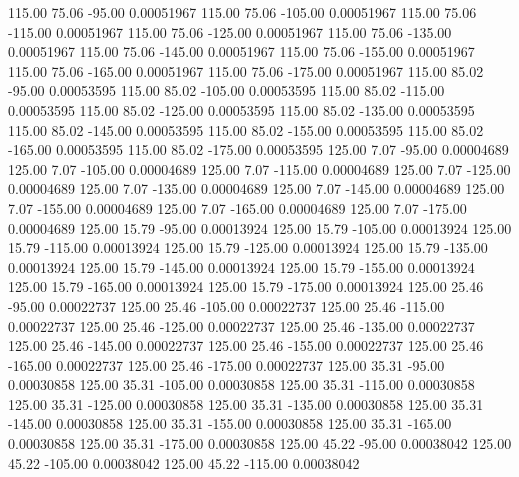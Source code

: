     115.00     75.06    -95.00     0.00051967
    115.00     75.06   -105.00     0.00051967
    115.00     75.06   -115.00     0.00051967
    115.00     75.06   -125.00     0.00051967
    115.00     75.06   -135.00     0.00051967
    115.00     75.06   -145.00     0.00051967
    115.00     75.06   -155.00     0.00051967
    115.00     75.06   -165.00     0.00051967
    115.00     75.06   -175.00     0.00051967
    115.00     85.02    -95.00     0.00053595
    115.00     85.02   -105.00     0.00053595
    115.00     85.02   -115.00     0.00053595
    115.00     85.02   -125.00     0.00053595
    115.00     85.02   -135.00     0.00053595
    115.00     85.02   -145.00     0.00053595
    115.00     85.02   -155.00     0.00053595
    115.00     85.02   -165.00     0.00053595
    115.00     85.02   -175.00     0.00053595
    125.00      7.07    -95.00     0.00004689
    125.00      7.07   -105.00     0.00004689
    125.00      7.07   -115.00     0.00004689
    125.00      7.07   -125.00     0.00004689
    125.00      7.07   -135.00     0.00004689
    125.00      7.07   -145.00     0.00004689
    125.00      7.07   -155.00     0.00004689
    125.00      7.07   -165.00     0.00004689
    125.00      7.07   -175.00     0.00004689
    125.00     15.79    -95.00     0.00013924
    125.00     15.79   -105.00     0.00013924
    125.00     15.79   -115.00     0.00013924
    125.00     15.79   -125.00     0.00013924
    125.00     15.79   -135.00     0.00013924
    125.00     15.79   -145.00     0.00013924
    125.00     15.79   -155.00     0.00013924
    125.00     15.79   -165.00     0.00013924
    125.00     15.79   -175.00     0.00013924
    125.00     25.46    -95.00     0.00022737
    125.00     25.46   -105.00     0.00022737
    125.00     25.46   -115.00     0.00022737
    125.00     25.46   -125.00     0.00022737
    125.00     25.46   -135.00     0.00022737
    125.00     25.46   -145.00     0.00022737
    125.00     25.46   -155.00     0.00022737
    125.00     25.46   -165.00     0.00022737
    125.00     25.46   -175.00     0.00022737
    125.00     35.31    -95.00     0.00030858
    125.00     35.31   -105.00     0.00030858
    125.00     35.31   -115.00     0.00030858
    125.00     35.31   -125.00     0.00030858
    125.00     35.31   -135.00     0.00030858
    125.00     35.31   -145.00     0.00030858
    125.00     35.31   -155.00     0.00030858
    125.00     35.31   -165.00     0.00030858
    125.00     35.31   -175.00     0.00030858
    125.00     45.22    -95.00     0.00038042
    125.00     45.22   -105.00     0.00038042
    125.00     45.22   -115.00     0.00038042
